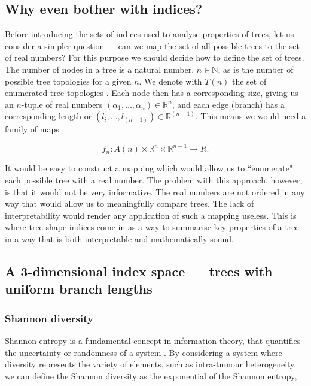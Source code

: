 \subsection{Why even bother with indices?}
Before introducing the sets of indices used to analyse properties of trees, let
us consider a simpler question --- can we map the set of all possible trees to
the set of real numbers? For this purpose we should decide how to define the set
of trees. The number of nodes in a tree is a natural number, $n\in\mathbb{N}$,
as is the number of possible tree topologies for a given $n$. We denote with
$T(n)$ the set of enumerated tree topologies \cite{nakano_tree_2016}. Each node
then has a corresponding size, giving us an $n$-tuple of real numbers
$(\alpha_1, \dots, \alpha_n)\in\mathbb{R}^n$, and each edge (branch) has a
corresponding length or $(l_i, \dots, l_{(n-1)})\in\mathbb{R}^{(n-1)}$. This
means we would need a family of maps

\begin{equation}
    f_n: A(n) \times \mathbb{R}^n \times \mathbb{R}^{n-1} \rightarrow R.
\end{equation}

It would be easy to construct a mapping which would allow us to ``enumerate"
each possible tree with a real number. The problem with this approach, however,
is that it would not be very informative. The real numbers are not ordered in
any way that would allow us to meaningfully compare trees. The lack of
interpretability would render any application of such a mapping useless. This is
where tree shape indices come in as a way to summarise key properties of a tree
in a way that is both interpretable and mathematically sound.

\subsection{A 3-dimensional index space --- trees with uniform branch lengths}

\subsubsection{Shannon diversity}
Shannon entropy is a fundamental concept in information theory, that quantifies
the uncertainty or randomness of a system \cite{shannon_mathematical_1948}. By
considering a system where diversity represents the variety of elements, such as
intra-tumour heterogeneity, we can define the Shannon diversity as the
exponential of the Shannon entropy,

